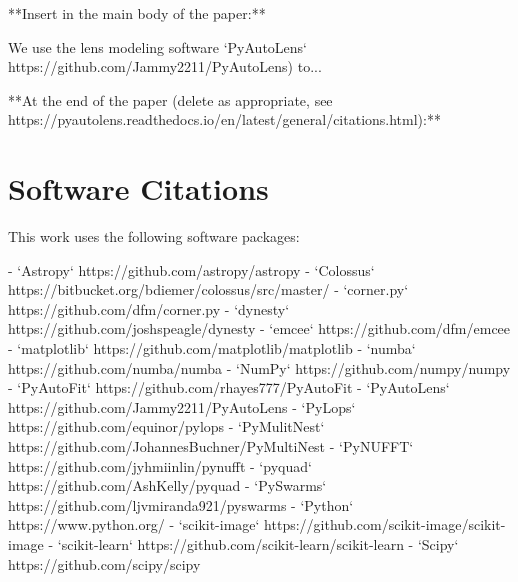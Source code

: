**Insert in the main body of the paper:**

We use the lens modeling software `PyAutoLens` https://github.com/Jammy2211/PyAutoLens) \citep{pyautolens, Nightingale2015, Nightingale2018} to...

**At the end of the paper (delete as appropriate, see https://pyautolens.readthedocs.io/en/latest/general/citations.html):**

\section{Software Citations}

This work uses the following software packages:

- `Astropy` https://github.com/astropy/astropy \citep{astropy1, astropy2}
- `Colossus` https://bitbucket.org/bdiemer/colossus/src/master/ \citep{colossus}
- `corner.py` https://github.com/dfm/corner.py \citep{corner2016}
- `dynesty` https://github.com/joshspeagle/dynesty \citep{dynesty}
- `emcee` https://github.com/dfm/emcee \citep{emcee}
- `matplotlib` https://github.com/matplotlib/matplotlib \citep{matplotlib}
- `numba` https://github.com/numba/numba \citep{numba}
- `NumPy` https://github.com/numpy/numpy \citep{numpy}
- `PyAutoFit` https://github.com/rhayes777/PyAutoFit \citep{pyautofit}
- `PyAutoLens` https://github.com/Jammy2211/PyAutoLens \citep{Nightingale2015, Nightingale2018, pyautolens}
- `PyLops` https://github.com/equinor/pylops \citep{pylops}
- `PyMulitNest` https://github.com/JohannesBuchner/PyMultiNest \citep{multinest, pymultinest}
- `PyNUFFT` https://github.com/jyhmiinlin/pynufft \citep{pynufft}
- `pyquad` https://github.com/AshKelly/pyquad \citep{pyquad}
- `PySwarms` https://github.com/ljvmiranda921/pyswarms \citep{pyswarms}
- `Python` https://www.python.org/ \citep{python}
- `scikit-image` https://github.com/scikit-image/scikit-image \citep{scikit-image}
- `scikit-learn` https://github.com/scikit-learn/scikit-learn \citep{scikit-learn}
- `Scipy` https://github.com/scipy/scipy \citep{scipy}